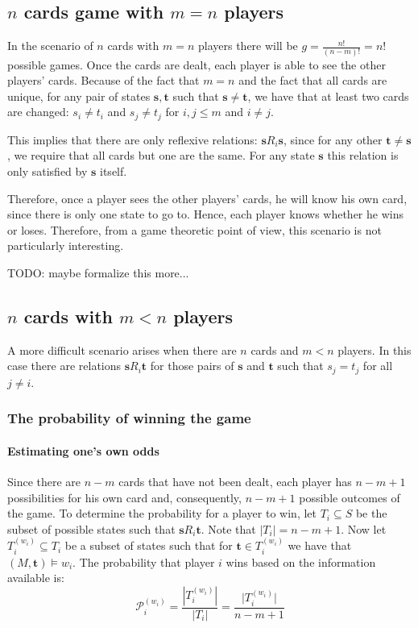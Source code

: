 \documentclass[a4paper,10pt]{article}
\begin{document}
\subsection{$n$ cards game with $m=n$ players}
In the scenario of $n$ cards with $m=n$ players there will be $\displaystyle g = \frac{n!}{(n-m)!} = n!$ possible games. Once the cards are dealt, each player is able to see the other players' cards. Because of the fact that $m=n$ and the fact that all cards are unique, for any pair of states $\boldsymbol s, \boldsymbol t$ such that $\boldsymbol s \neq \boldsymbol t$, we have that at least two cards are changed: $s_i \neq t_i$ and $s_j \neq t_j$ for $i,j\leq m$ and $i\neq j$.

This implies that there are only reflexive relations: $\boldsymbol s R_i \boldsymbol s$, since for any other $\boldsymbol t \neq \boldsymbol s$, we require that all cards but one are the same. For any state $\boldsymbol s$ this relation is only satisfied by $\boldsymbol s$ itself.

Therefore, once a player sees the other players' cards, he will know his own card, since there is only one state to go to. Hence, each player knows whether he wins or loses. Therefore, from a game theoretic point of view, this scenario is not particularly interesting.

TODO: maybe formalize this more...

\subsection{$n$ cards with $m<n$ players}
A more difficult scenario arises when there are $n$ cards and $m < n$ players. In this case there are relations $\boldsymbol s R_i \boldsymbol t$ for those pairs of $\boldsymbol s$ and $\boldsymbol t$ such that $s_j = t_j$ for all $j\neq i$.

\subsubsection{The probability of winning the game}

\paragraph{Estimating one's own odds}
Since there are $n-m$ cards that have not been dealt, each player has $n-m+1$ possibilities for his own card and, consequently, $n-m+1$ possible outcomes of the game. To determine the probability for a player to win, let $T_i \subseteq S$ be the subset of possible states such that $\boldsymbol s R_i \boldsymbol t$. Note that $|T_i| = n-m+1$. Now let $T^{(w_i)}_i \subseteq T_i$ be a subset of states such that for $\boldsymbol t \in T^{(w_i)}_i$ we have that $(M,\boldsymbol t) \models w_i$. The probability that player $i$ wins based on the information available is:
\begin{equation}
\mathcal{P}^{(w_i)}_i = \frac{|T^{(w_i)}_i|}{|T_i|} = \frac{\lvert T^{(w_i)}_i\rvert}{n-m+1}
\end{equation}
\end{document}
